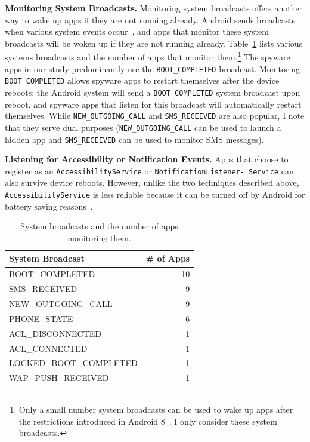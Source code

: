 \textbf{Monitoring System Broadcasts.} Monitoring system broadcasts offers another way to wake up apps if they are not running already. Android sends broadcasts when various system events occur~\cite{Broadcas25:online}, and apps that monitor these system broadcasts will be woken up if they are not running already. Table~\ref{tab:monitor_broadcast} lists various systems broadcasts and the number of apps that monitor them.\footnote{Only a small number system broadcasts can be used to wake up apps after the restrictions introduced in Android 8~\cite{Implicit72:online}. I only consider these system broadcasts.} The spyware apps in our study predominantly use the \texttt{BOOT\_COMPLETED} broadcast. Monitoring
\texttt{BOOT\_COMPLETED} allows spyware apps to restart themselves
after the device reboots: the Android system will send a
\texttt{BOOT\_COMPLETED} system broadcast upon reboot, and spyware apps that listen
for this broadcast will automatically restart themselves. While \texttt{NEW\_OUTGOING\_CALL} and \texttt{SMS\_RECEIVED} are also popular, I note that they serve dual purposes (\texttt{NEW\_OUTGOING\_CALL} can be used to launch a hidden app and \texttt{SMS\_RECEIVED} can be used to monitor SMS messages).

\textbf{Listening for Accessibility or Notification Events.} Apps that choose to register as an
\texttt{AccessibilityService} or
\texttt{NotificationListener- Service}
can also survive device
reboots. However, unlike the two techniques described above,
\texttt{AccessibilityService}
is less reliable because it can be
turned off by Android for battery saving reasons~\cite{AndroidA0:online,Accessib46:online}.


\begin{table}[t]
  \caption{System broadcasts and the number of apps monitoring them.\label{tab:monitor_broadcast}}
  \centering
  \begin{tabular}{lr}
    System Broadcast         &\# of Apps  \\
    \midrule
    BOOT\_COMPLETED          &10          \\
    SMS\_RECEIVED            &9           \\
    NEW\_OUTGOING\_CALL      &9           \\
    PHONE\_STATE             &6           \\
    ACL\_DISCONNECTED        &1           \\
    ACL\_CONNECTED           &1           \\
    LOCKED\_BOOT\_COMPLETED  &1           \\
    WAP\_PUSH\_RECEIVED      &1           \\
  \end{tabular}
  
\end{table}

